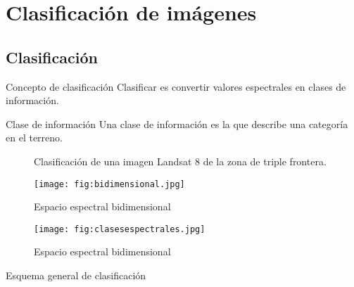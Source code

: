\section{Clasificación de imágenes}

\subsection{Clasificación}
\begin{frame}{}
\begin{block}{Concepto de clasificación}
  Clasificar es convertir valores espectrales en clases de información.
\end{block}
\end{frame}

\begin{frame}{}
\begin{block}{Clase de información}
  Una clase de información es la que describe una categoría en el terreno.
\end{block}
\end{frame}

\begin{frame}{}
  \begin{figure}
    \centering
    \hspace{1cm}
    \caption{Clasificación de una imagen Landsat 8 de la zona de triple frontera.}
    \label{}
  \end{figure}
\end{frame}

\begin{frame}{}
  \begin{figure}
    \centering
    \texttt{[image: fig:bidimensional.jpg]}
    \caption{Espacio espectral bidimensional}
    \label{}
  \end{figure}
\end{frame}


\begin{frame}{}
  \begin{figure}
    \centering
    \texttt{[image: fig:clasesespectrales.jpg]}
    \caption{Espacio espectral bidimensional}
    \label{}
  \end{figure}
\end{frame}
\begin{frame}{}
  \begin{block}{Esquema general de clasificación}
    \begin{center}
    \end{center}
  \end{block}
\end{frame}

